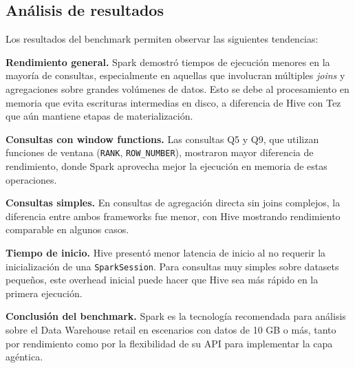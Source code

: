 \subsection{Análisis de resultados}

Los resultados del benchmark permiten observar las siguientes tendencias:

\textbf{Rendimiento general.}
Spark demostró tiempos de ejecución menores en la mayoría de consultas,
especialmente en aquellas que involucran múltiples \textit{joins} y agregaciones sobre
grandes volúmenes de datos. Esto se debe al procesamiento en memoria que evita
escrituras intermedias en disco, a diferencia de Hive con Tez que aún mantiene
etapas de materialización.

\textbf{Consultas con window functions.}
Las consultas Q5 y Q9, que utilizan funciones de ventana (\texttt{RANK}, \texttt{ROW\_NUMBER}),
mostraron mayor diferencia de rendimiento, donde Spark aprovecha mejor la ejecución
en memoria de estas operaciones.

\textbf{Consultas simples.}
En consultas de agregación directa sin joins complejos, la diferencia entre ambos
frameworks fue menor, con Hive mostrando rendimiento comparable en algunos casos.

\textbf{Tiempo de inicio.}
Hive presentó menor latencia de inicio al no requerir la inicialización de una
\texttt{SparkSession}. Para consultas muy simples sobre datasets pequeños,
este overhead inicial puede hacer que Hive sea más rápido en la primera ejecución.

\textbf{Conclusión del benchmark.}
Spark es la tecnología recomendada para análisis sobre el Data Warehouse retail
en escenarios con datos de 10 GB o más, tanto por rendimiento como por la
flexibilidad de su API para implementar la capa agéntica.
